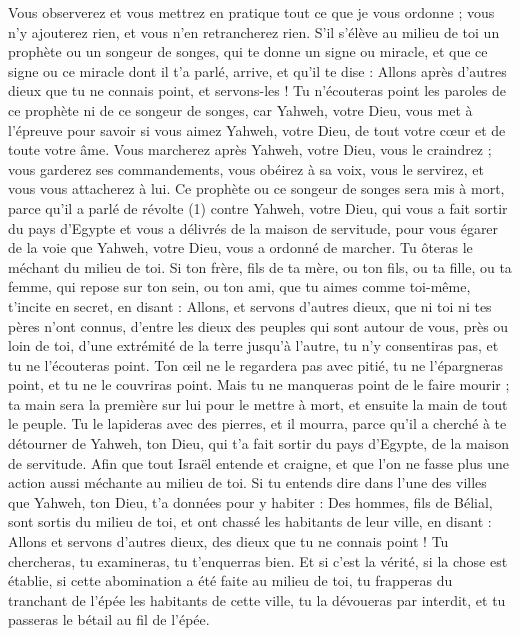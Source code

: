 \begin{multicols}{2}
Vous observerez et vous mettrez en pratique tout ce que je vous ordonne ; vous n'y ajouterez rien, et vous n'en retrancherez rien.
\VerseOne{}S'il s'élève au milieu de toi un prophète ou un songeur de songes, qui te donne un signe ou miracle,
et que ce signe ou ce miracle dont il t’a parlé, arrive, et qu’il te dise : Allons après d'autres dieux que tu ne connais point, et servons-les !
Tu n'écouteras point les paroles de ce prophète ni de ce songeur de songes, car Yahweh, votre Dieu, vous met à l’épreuve pour savoir si vous aimez Yahweh, votre Dieu, de tout votre cœur et de toute votre âme.
Vous marcherez après Yahweh, votre Dieu, vous le craindrez ; vous garderez ses commandements, vous obéirez à sa voix, vous le servirez, et vous vous attacherez à lui.
Ce prophète ou ce songeur de songes sera mis à mort, parce qu'il a parlé de révolte (1) contre Yahweh, votre Dieu, qui vous a fait sortir du pays d'Egypte et vous a délivrés de la maison de servitude, pour vous égarer de la voie que Yahweh, votre Dieu, vous a ordonné de marcher. Tu ôteras le méchant du milieu de toi.
Si ton frère, fils de ta mère, ou ton fils, ou ta fille, ou ta femme, qui repose sur ton sein, ou ton ami, que tu aimes comme toi-même, t'incite en secret, en disant : Allons, et servons d'autres dieux, que ni toi ni tes pères n’ont connus,
d'entre les dieux des peuples qui sont autour de vous, près ou loin de toi, d’une extrémité de la terre jusqu'à l'autre,
tu n’y consentiras pas, et tu ne l'écouteras point. Ton œil ne le regardera pas avec pitié, tu ne l’épargneras point, et tu ne le couvriras point.
Mais tu ne manqueras point de le faire mourir ; ta main sera la première sur lui pour le mettre à mort, et ensuite la main de tout le peuple.
Tu le lapideras avec des pierres, et il mourra, parce qu'il a cherché à te détourner de Yahweh, ton Dieu, qui t'a fait sortir du pays d'Egypte, de la maison de servitude.
Afin que tout Israël entende et craigne, et que l'on ne fasse plus une action aussi méchante au milieu de toi.
Si tu entends dire dans l'une des villes que Yahweh, ton Dieu, t’a données pour y habiter :
Des hommes, fils de Bélial, sont sortis du milieu de toi, et ont chassé les habitants de leur ville, en disant : Allons et servons d'autres dieux, des dieux que tu ne connais point !
Tu chercheras, tu examineras, tu t’enquerras bien. Et si c’est la vérité, si la chose est établie, si cette abomination a été faite au milieu de toi,
tu frapperas du tranchant de l'épée les habitants de cette ville, tu la dévoueras par interdit, et tu passeras le bétail au fil de l'épée.

\end{multicols}
